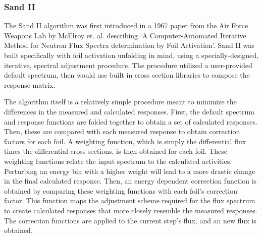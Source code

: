 \subsubsection{Sand II}

The Sand II algorithm was first introduced in a 1967 paper from the Air Force Weapons Lab by McElroy et. al. describing `A Computer-Automated Iterative Method for Neutron Flux Spectra determination by Foil Activation'.
Sand II was built specifically with foil activation unfolding in mind, using a specially-designed, iterative, spectral adjustment procedure.
The procedure utilized a user-provided default spectrum, then would use built in cross section libraries to compose the response matrix.

The algorithm itself is a relatively simple procedure meant to minimize the differences in the measured and calculated responses.
First, the default spectrum and response functions are folded together to obtain a set of calculated responses.
Then, these are compared with each measured response to obtain correction factors for each foil.
A weighting function, which is simply the differential flux times the differential cross sections, is then obtained for each foil.
These weighting functions relate the input spectrum to the calculated activities.
Perturbing an energy bin with a higher weight will lead to a more drastic change in the final calculated response.
Then, an energy dependent correction function is obtained by comparing these weighting functions with each foil's correction factor.
This function maps the adjustment scheme required for the flux spectrum to create calculated responses that more closely resemble the measured responses.
The correction functions are applied to the current step's flux, and an new flux is obtained.

